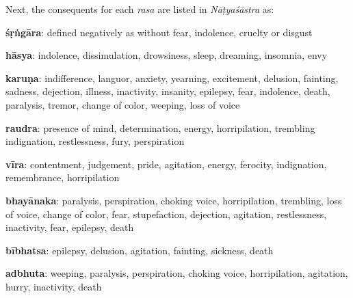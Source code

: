 Next, the consequents for each \textsl{rasa} are listed in \textsl{Nāṭyaśāstra} as: 

\textbf{śṛṅgāra}: defined negatively as without fear, indolence, cruelty or disgust

\textbf{hāsya}: indolence, dissimulation, drowsiness, sleep, dreaming, insomnia, envy

\textbf{karuṇa}: indifference, languor, anxiety, yearning, excitement, delusion, fainting, sadness, dejection, illness, inactivity, insanity, epilepsy, fear, indolence, death, paralysis, tremor, change of color, weeping, loss of voice

\textbf{raudra}: presence of mind, determination, energy, horripilation, trembling indignation, restlessness, fury, perspiration

\textbf{vīra}: contentment, judgement, pride, agitation, energy, ferocity, indignation, remembrance, horripilation

\textbf{bhayānaka}: paralysis, perspiration, choking voice, horripilation, trembling, loss of voice, change of color, fear, stupefaction, dejection, agitation, restlessness, inactivity, fear, epilepsy, death

\textbf{bībhatsa}: epilepsy, delusion, agitation, fainting, sickness, death

\textbf{adbhuta}:
 weeping, paralysis, perspiration, choking voice, horripilation, agitation, hurry, inactivity, death

